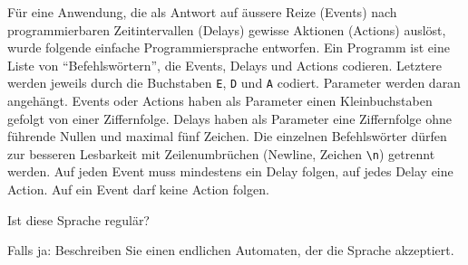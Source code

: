 Für eine Anwendung, die als Antwort auf äussere Reize (Events)
nach programmierbaren Zeitintervallen (Delays) gewisse Aktionen (Actions)
auslöst, wurde folgende einfache Programmiersprache entworfen. Ein
Programm ist eine Liste von ``Befehlswörtern'', die Events, Delays und Actions
codieren. Letztere werden
jeweils durch die Buchstaben {\tt E}, {\tt D} und {\tt A} codiert.
Parameter werden daran angehängt. Events oder Actions haben als Parameter
einen Kleinbuchstaben gefolgt von einer Ziffernfolge. Delays haben als
Parameter eine Ziffernfolge ohne führende Nullen und maximal fünf
Zeichen. Die einzelnen Befehlswörter dürfen zur besseren Lesbarkeit mit Zeilenumbrüchen
(Newline, Zeichen \verb+\n+) getrennt werden. Auf jeden Event muss mindestens
ein Delay folgen, auf jedes Delay eine Action. Auf ein Event darf keine Action folgen.
\begin{teilaufgaben}
\item Ist diese Sprache regulär?
\item Falls ja: Beschreiben Sie einen endlichen Automaten, der die
Sprache akzeptiert.
\end{teilaufgaben}

